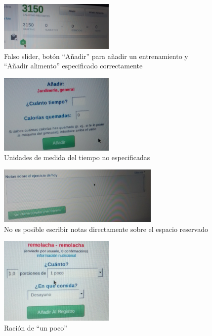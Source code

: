 \documentclass[a4paper]{article}
\begin{document}
			\begin{figure}[!h]
				\centering
				\includegraphics[width=0.5\textwidth]{./figuras/andoni1.jpg}
				\caption{Falso slider, botón ``Añadir'' para añadir un entrenamiento y ``Añadir alimento'' especificado correctamente}
			\end{figure}
			\begin{figure}[!h]
				\centering
				\includegraphics[width=0.5\textwidth]{./figuras/andoni2.jpg}
				\caption{Unidades de medida del tiempo no especificadas}
			\end{figure}
			\begin{figure}[!h]
				\centering
				\includegraphics[width=0.7\textwidth]{./figuras/andoni3.jpg}
				\caption{No es posible escribir notas directamente sobre el espacio reservado}
			\end{figure}
			\begin{figure}[!h]
				\centering
				\includegraphics[width=0.5\textwidth]{./figuras/andoni4.jpg}
				\caption{Ración de ``un poco''}
			\end{figure}
\end{document}
